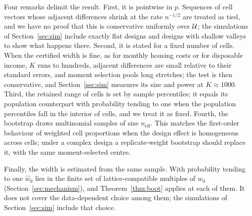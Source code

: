 Four remarks delimit the result. First, it is pointwise in $p$. Sequences of cell vectors whose adjacent differences shrink at the rate $n^{-1/2}$ are treated as tied, and we have no proof that this is conservative uniformly over $\mathcal{U}$; the simulations of Section~\ref{sec:sim} include exactly flat designs and designs with shallow valleys to show what happens there. Second, it is stated for a fixed number of cells. When the certified width is fine, as for monthly housing costs or for disposable income, $K$ runs to hundreds, adjacent differences are small relative to their standard errors, and moment selection pools long stretches; the test is then conservative, and Section~\ref{sec:sim} measures its size and power at $K\approx1000$. Third, the retained range of cells is set by sample percentiles; it equals its population counterpart with probability tending to one when the population percentiles fall in the interior of cells, and we treat it as fixed. Fourth, the bootstrap draws multinomial samples of size $n_{\mathrm{eff}}$. This matches the first-order behaviour of weighted cell proportions when the design effect is homogeneous across cells; under a complex design a replicate-weight bootstrap should replace it, with the same moment-selected centre.

Finally, the width is estimated from the same sample. With probability tending to one $\hat w_0$ lies in the finite set of lattice-compatible multiples of $w_0$ (Section~\ref{sec:mechanism}), and Theorem~\ref{thm:boot} applies at each of them. It does not cover the data-dependent choice among them; the simulations of Section~\ref{sec:sim} include that choice.
